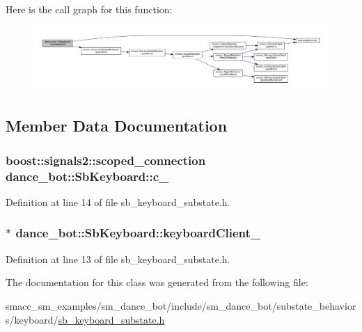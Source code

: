 Here is the call graph for this function\+:
\nopagebreak
\begin{figure}[H]
\begin{center}
\leavevmode
\includegraphics[width=350pt]{classdance__bot_1_1SbKeyboard_a18cd04fb8536e7fe793f74f011077b9d_cgraph}
\end{center}
\end{figure}




\subsection{Member Data Documentation}
\subsubsection[{\texorpdfstring{c\+\_\+}{c_}}]{\setlength{\rightskip}{0pt plus 5cm}boost\+::signals2\+::scoped\+\_\+connection dance\+\_\+bot\+::\+Sb\+Keyboard\+::c\+\_\+}\hypertarget{classdance__bot_1_1SbKeyboard_a2aba1d79ed731af4fefe01d08f639dd4}{}\label{classdance__bot_1_1SbKeyboard_a2aba1d79ed731af4fefe01d08f639dd4}


Definition at line 14 of file sb\+\_\+keyboard\+\_\+substate.\+h.

\subsubsection[{\texorpdfstring{keyboard\+Client\+\_\+}{keyboardClient_}}]{$\ast$ dance\+\_\+bot\+::\+Sb\+Keyboard\+::keyboard\+Client\+\_\+}\hypertarget{classdance__bot_1_1SbKeyboard_a647842945b284cb2013a3bbcbaf38315}{}\label{classdance__bot_1_1SbKeyboard_a647842945b284cb2013a3bbcbaf38315}


Definition at line 13 of file sb\+\_\+keyboard\+\_\+substate.\+h.



The documentation for this class was generated from the following file\+:\begin{DoxyCompactItemize}
\item 
smacc\+\_\+sm\+\_\+examples/sm\+\_\+dance\+\_\+bot/include/sm\+\_\+dance\+\_\+bot/substate\+\_\+behaviors/keyboard/\hyperlink{sb__keyboard__substate_8h}{sb\+\_\+keyboard\+\_\+substate.\+h}\end{DoxyCompactItemize}
